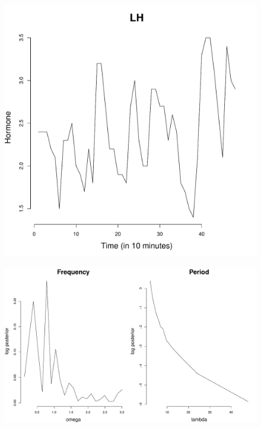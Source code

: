 \documentclass[12pt]{article}
\begin{document}
\begin{figure}[H]
\begin{center}
\includegraphics[scale=0.40]{dat_lh.pdf}
\end{center}
\end{figure}

\begin{figure}[H]
\begin{center}
\includegraphics[scale=0.40]{fp_lh.pdf}
\end{center}
\end{figure}
\end{document}
